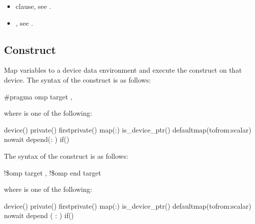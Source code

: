 \crossreferences
\begin{itemize}
\item {} clause, see 
.

\item {}, see 
. 
\end{itemize}









\subsection{ Construct}
\label{subsec:target Construct}
\summary
Map variables to a device data environment and execute the construct on that device.
\syntax
\ccppspecificstart
The syntax of the  construct is as follows:

\begin{boxedcode}
\#pragma omp target \plc{[clause[ [},\plc{] clause] ... ] new-line}
\end{boxedcode}

where  is one of the following:

\begin{indentedcodelist}
device()
private()
firstprivate()
map(\plc{[[map-type-modifier[,]] map-type}:\plc{ ] list})
is\_device\_ptr()
defaultmap(tofrom:scalar)
nowait
depend(: )
if()
\end{indentedcodelist}
\ccppspecificend

\begin{samepage}
\smallskip
\fortranspecificstart
The syntax of the  construct is as follows:

\begin{boxedcode}
!\$omp target \plc{[clause[ [},\plc{] clause] ... ]}
!\$omp end target
\end{boxedcode}
\end{samepage}

\begin{samepage}
where  is one of the following:

\begin{indentedcodelist}
device()
private()
firstprivate()
map(\plc{[[map-type-modifier[,]] map-type}:\plc{ ] list})
is\_device\_ptr()
defaultmap(tofrom:scalar)
nowait
depend ( : )
if()
\end{indentedcodelist}
\end{samepage}

